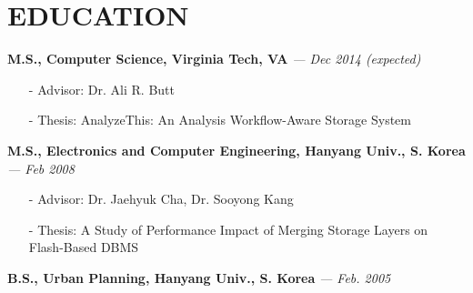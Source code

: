 \section{EDUCATION}
\vspace{0.07in} 
{\bf M.S., Computer Science, Virginia Tech, VA}
{\footnotesize{\it --- Dec 2014 (expected)}}
\begin{itemize}[leftmargin=*]
\setlength\itemsep{-0.02in}
  \item[-] {\small Advisor: Dr. Ali R. Butt}
  \item[-] {\small Thesis: AnalyzeThis: An Analysis Workflow-Aware Storage System}
\end{itemize}
\vspace{-0.15in}
{\bf M.S., Electronics and Computer Engineering, Hanyang Univ., S. Korea}
{\footnotesize{\it --- Feb 2008}}
\begin{itemize}[leftmargin=*]
\setlength\itemsep{-0.02in}
  \item[-] {\small Advisor: Dr. Jaehyuk Cha, Dr. Sooyong Kang}
  \item[-] {\small Thesis: A Study of Performance Impact of Merging Storage Layers on
  Flash-Based DBMS}
\end{itemize}
\vspace{-0.15in}
{\bf B.S., Urban Planning, Hanyang Univ., S. Korea}
{\footnotesize{\it --- Feb. 2005}}


